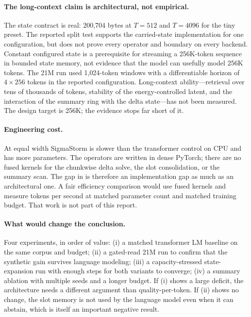 \paragraph{The long-context claim is architectural, not empirical.}
The state contract is real: 200{,}704 bytes at $T=512$ and $T=4096$ for the tiny preset. The
reported split test supports the carried-state implementation for one configuration, but does
not prove every operator and boundary on every backend. Constant configured state is a
prerequisite for streaming a 256K-token sequence in bounded state memory, not evidence that the
model can usefully model 256K tokens. The 21M run used 1{,}024-token windows with a
differentiable horizon of $4\times256$ tokens in the reported configuration. Long-context
ability---retrieval over tens of thousands of tokens, stability of the energy-controlled latent,
and the interaction of the summary ring with the delta state---has not been measured. The design
target is 256K; the evidence stops far short of it.

\paragraph{Engineering cost.}
At equal width SigmaStorm is slower than the transformer control on CPU and has more
parameters. The operators are written in dense PyTorch; there are no fused kernels for the
chunkwise delta solve, the slot consolidation, or the summary scan. The gap in
 is therefore an implementation gap as much as an architectural one. A fair
efficiency comparison would use fused kernels and measure tokens per second at matched
parameter count and matched training budget. That work is not part of this report.

\paragraph{What would change the conclusion.}
Four experiments, in order of value: (i) a matched transformer LM baseline on the same corpus
and budget; (ii) a gated-read 21M run to confirm that the synthetic gain survives language
modeling; (iii) a capacity-stressed state-expansion run with enough steps for both variants to
converge; (iv) a summary ablation with multiple seeds and a longer budget. If (i) shows a large
deficit, the architecture needs a different argument than quality-per-token. If (ii) shows no
change, the slot memory is not used by the language model even when it can abstain, which is
itself an important negative result.

